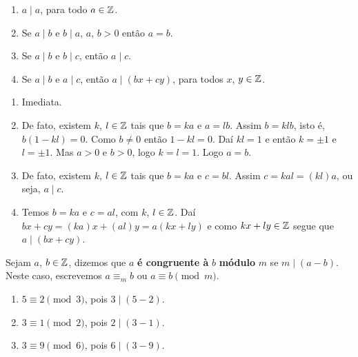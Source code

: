 \begin{proposicao}
    \begin{enumerate}[label={\roman*})]
        \item $a\mid a$, para todo $a \in \mathbb{Z}$.
        \item Se $a\mid b$ e $b\mid a$, $a$, $b > 0$ então $a = b$.
        \item Se $a\mid b$ e $b\mid c$, então $a\mid c$.
        \item Se $a\mid b$ e $a\mid c$, então $a\mid (bx+cy)$, para todos $x$, $y \in \mathbb{Z}$.
    \end{enumerate}
\end{proposicao}
\begin{prova}
    \begin{enumerate}[label={\roman*})]
        \item Imediata.

        \item De fato, existem $k$, $l \in \mathbb{Z} $ tais que $b = ka$ e $a = lb$. Assim $b = klb$, isto é, $b(1 - kl) = 0$.
        Como $b \ne 0$ então $1 - kl = 0$. Daí $kl = 1$ e então $k = \pm 1$ e $l = \pm 1$. Mas $a > 0$ e $b > 0$, logo $k = l =1$. Logo $a = b$.

        \item De fato, existem $k$, $l \in \mathbb{Z}$ tais que $b = ka$ e $c = bl$. Assim  $c = kal = (kl)a$, ou seja, $a\mid c$.

        \item Temos $b = ka$ e $c = al$, com $k$, $l \in \mathbb{Z}$. Daí $bx + cy = (ka)x + (al)y = a(kx + ly)$ e como $kx + ly \in \mathbb{Z}$ segue que $a \mid (bx + cy)$.
    \end{enumerate}
\end{prova}

\begin{definicao}
    Sejam $a$, $b \in\mathbb{Z}$, dizemos que $a$ \textbf{é congruente \`a} $b$ \textbf{módulo} $m$ se $m \mid (a-b)$. Neste caso, escrevemos $a\equiv_{m} b$ ou $a\equiv b \pmod{m}$.
\end{definicao}

\begin{exemplos}
    \begin{enumerate}[label={\arabic*})]
        \item $5\equiv 2 \pmod{3}$, pois $3 \mid (5-2)$.
        \item $3\equiv 1 \pmod{2}$, pois $2\mid (3-1)$.
        \item $3\equiv 9 \pmod{6}$, pois $6\mid (3-9)$.
    \end{enumerate}
\end{exemplos}

